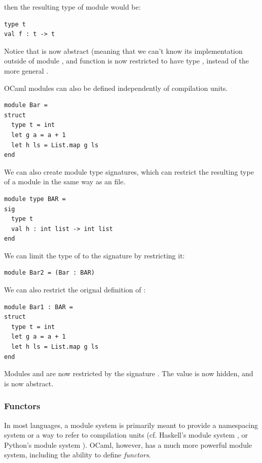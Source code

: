 then the resulting type of module  would be:

\begin{lstlisting}
type t
val f : t -> t
\end{lstlisting}

Notice that  is now abstract (meaning that we can't know
its implementation outside of module , and function 
is now restricted to have type , instead of the more
general .

OCaml modules can also be defined independently of compilation
units.

\begin{lstlisting}
module Bar =
struct
  type t = int
  let g a = a + 1
  let h ls = List.map g ls
end
\end{lstlisting}

We can also create module type signatures, which can restrict the
resulting type of a module in the same way as an  file.

\begin{lstlisting}
module type BAR =
sig
  type t
  val h : int list -> int list
end
\end{lstlisting}

We can limit the type of  to the signature
 by restricting it:

\begin{lstlisting}
module Bar2 = (Bar : BAR)
\end{lstlisting}

We can also restrict the orignal definition of :

\begin{lstlisting}
module Bar1 : BAR =
struct
  type t = int
  let g a = a + 1
  let h ls = List.map g ls
end
\end{lstlisting}

Modules  and  are now restricted by the
signature . The value  is now hidden, and
 is now abstract.

\subsubsection{Functors}

In most languages, a module system is primarily meant to provide a
namespacing system or a way to refer to compilation units
(cf. Haskell's module system \cite{www:haskell:modules}, or Python's
module system \cite{www:python:modules}). OCaml, however, has a much
more powerful module system, including the ability to define
\textit{functors}.


